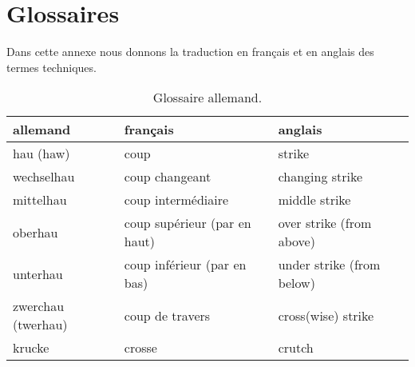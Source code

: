 \chapter{Glossaires}


Dans cette annexe nous donnons la traduction en français et en anglais des termes techniques.




\begin{table}[h]
	\centering
	\begin{tabular}{lll}
		allemand &
			français &
			anglais
			\\
		\hline
		hau (haw) &
			coup &
			strike
			\\
		wechselhau &
			coup changeant &
			changing strike
			\\
		mittelhau &
			coup intermédiaire &
			middle strike
			\\
		oberhau &
			coup supérieur (par en haut) &
			over strike (from above)
			\\
		unterhau &
			coup inférieur (par en bas) &
			under strike (from below)
			\\
		zwerchau (twerhau) &
			coup de travers &
			cross(wise) strike
			\\
		krucke &
			crosse &
			crutch
	\end{tabular}
	\caption{Glossaire allemand.}
	\label{app:tab:glossaire-allemand}
\end{table}

